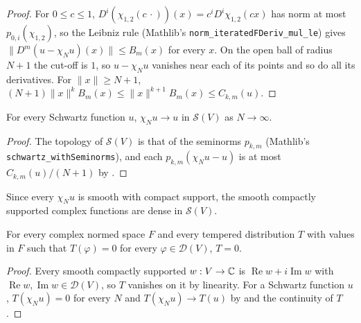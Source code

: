 \begin{proof}
\leanok
For $0 \leq c \leq 1$, $D^i(\chi_{1,2}(c \,\cdot))(x) = c^i D^i \chi_{1,2}(c x)$ has norm at most
$p_{0,i}(\chi_{1,2})$, so the Leibniz rule (Mathlib's
\texttt{norm\_\allowbreak iteratedFDeriv\_\allowbreak mul\_\allowbreak le}) gives
$\|D^m (u - \chi_N u)(x)\| \leq B_m(x)$ for every $x$. On the open ball of radius $N + 1$ the
cut-off is $1$, so $u - \chi_N u$ vanishes near each of its points and so do all its
derivatives. For $\|x\| \geq N + 1$,
$(N + 1) \|x\|^k B_m(x) \leq \|x\|^{k+1} B_m(x) \leq C_{k,m}(u)$.
\end{proof}

\begin{lemma}
\label{lem:schwartz-cutoff-tendsto}
\leanok
{}
For every Schwartz function $u$, $\chi_N u \to u$ in $\mathcal S(V)$ as $N \to \infty$.
\end{lemma}

\begin{proof}
\leanok
The topology of $\mathcal S(V)$ is that of the seminorms $p_{k,m}$ (Mathlib's
\texttt{schwartz\_\allowbreak withSeminorms}), and each $p_{k,m}(\chi_N u - u)$ is at most
$C_{k,m}(u) / (N + 1)$ by .
\end{proof}

Since every $\chi_N u$ is smooth with compact support, the smooth compactly supported complex
functions are dense in $\mathcal S(V)$.

\begin{theorem}
\label{thm:test-functions-determine}
\leanok
{}
For every complex normed space $F$ and every tempered distribution $T$ with values in $F$ such
that $T(\varphi) = 0$ for every $\varphi \in \mathcal D(V)$, $T = 0$.
\end{theorem}

\begin{proof}
\leanok
Every smooth compactly supported $w : V \to \mathbb{C}$ is $\operatorname{Re} w + i \operatorname{Im} w$
with $\operatorname{Re} w, \operatorname{Im} w \in \mathcal D(V)$, so $T$ vanishes on it by
linearity. For a Schwartz function $u$, $T(\chi_N u) = 0$ for every $N$ and
$T(\chi_N u) \to T(u)$ by  and the continuity of $T$.
\end{proof}

